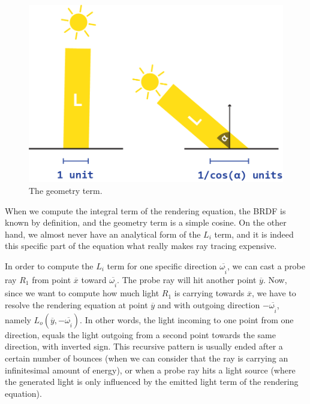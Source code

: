 \documentclass{PoliMi_MasterThesis}
\begin{document}
\begin{figure}[H]
    \centering
    \includegraphics[width=\textwidth*\real{0.45}]{Images/geometry_term.png}
    \caption{The geometry term.}
    \label{fig:geometry_term}
\end{figure}

When we compute the integral term of the rendering equation, the BRDF is known by definition, and the geometry term is a simple cosine. On the other hand, we almost never have an analytical form of the $L_i$ term, and it is indeed this specific part of the equation what really makes ray tracing expensive.

In order to compute the $L_i$ term for one specific direction $\overline{\omega_{\tilde{i}}}$, we can cast a probe ray $R_1$ from point $\overline{x}$ toward $\overline{\omega_{\tilde{i}}}$. The probe ray will hit another point $\overline{y}$. Now, since we want to compute how much light $R_1$ is carrying towards $\overline{x}$, we have to resolve the rendering equation at point $\overline{y}$ and with outgoing direction $-\overline{\omega_{\tilde{i}}}$, namely $L_o(\overline{y}, -\overline{\omega_{\tilde{i}}})$. In other words, the light incoming to one point from one direction, equals the light outgoing from a second point towards the same direction, with inverted sign. This recursive pattern is usually ended after a certain number of bounces (when we can consider that the ray is carrying an infinitesimal amount of energy), or when a probe ray hits a light source (where the generated light is only influenced by the emitted light term of the rendering equation).
\end{document}
